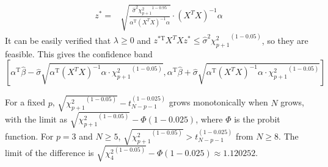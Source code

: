 \begin{sol}
\begin{enumerate}
\begin{align*}
z^*=&\sqrt{\frac{\hat{\sigma}^2{\chi_{p+1}^2}^{1-0.95}}{\alpha^\mathrm{T}(X^TX)^{-1}\alpha}}\cdot(X^TX)^{-1}\alpha
\end{align*}
It can be easily verified that $\lambda\ge0$ and $z^\mathrm{*T}X^TXz^*\le\hat{\sigma}^2{\chi_{p+1}^2}^{(1-0.05)}$, so they are feasible. This gives the confidence band
\[
\left[\alpha^\mathrm{T}\hat{\beta}-\hat{\sigma}\sqrt{\alpha^\mathrm{T}(X^TX)^{-1}\alpha\cdot {\chi_{p+1}^2}^{(1-0.05)}},
\alpha^\mathrm{T}\hat{\beta}+\hat{\sigma}\sqrt{\alpha^\mathrm{T}(X^TX)^{-1}\alpha\cdot {\chi_{p+1}^2}^{(1-0.05)}}
\right]
\]
\end{enumerate}
For a fixed $p$, $\sqrt{{\chi_{p+1}^2}^{(1-0.05)}}-t_{N-p-1}^{(1-0.025)}$ grows monotonically when $N$ grows, with the limit as $\sqrt{{\chi_{p+1}^2}^{(1-0.05)}}-\Phi(1-0.025)$, where $\Phi$ is the probit function. For $p=3$ and $N\ge 5$, $\sqrt{{\chi_{p+1}^2}^{(1-0.05)}}>t_{N-p-1}^{(1-0.025)}$ from $N\ge 8$. The limit of the difference is $\sqrt{{\chi_{4}^2}^{(1-0.05)}}-\Phi(1-0.025)\approx 1.120252$.
\end{sol}

